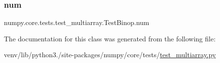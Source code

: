 \subsubsection{\texorpdfstring{num}{num}}
{\footnotesize\ttfamily numpy.\+core.\+tests.\+test\+\_\+multiarray.\+Test\+Binop.\+num}



The documentation for this class was generated from the following file\+:\begin{DoxyCompactItemize}
\item 
venv/lib/python3./site-\/packages/numpy/core/tests/\hyperlink{core_2tests_2test__multiarray_8py}{test\+\_\+multiarray.\+py}\end{DoxyCompactItemize}
